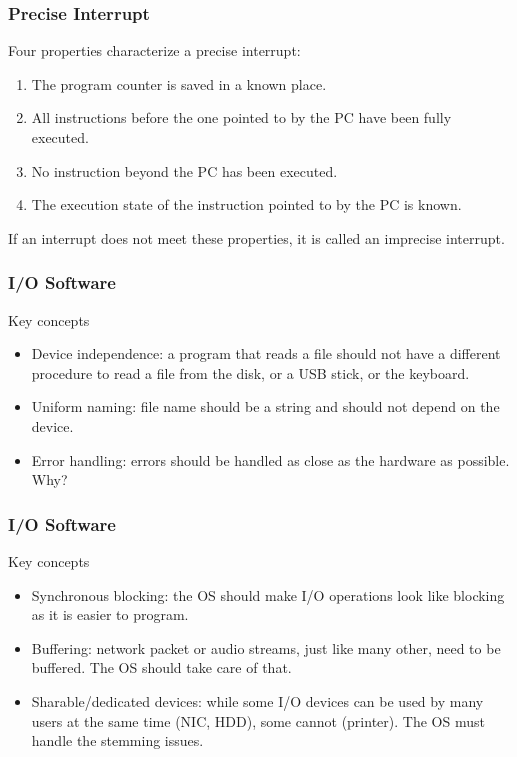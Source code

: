 \begin{frame}
  \frametitle{Precise Interrupt}
  Four properties characterize a precise interrupt:
  \begin{enumerate}
    \item The program counter is saved in a known place.
    \item All instructions before the one pointed to by the PC have been fully executed.
    \item No instruction beyond the PC has been executed.
    \item The execution state of the instruction pointed to by the PC is known.
  \end{enumerate}
  If an interrupt does not meet these properties, it is called an imprecise interrupt.
\end{frame}

\begin{frame}
  \frametitle{I/O Software}
  \begin{block}{Key concepts}
    \begin{itemize}
      \item Device independence: a program that reads a file should not have a different procedure to read a file from the disk, or a USB stick, or the keyboard.
      \item Uniform naming: file name should be a string and should not depend on the device.
      \item Error handling: errors should be handled as close as the hardware as possible. Why? %
    \end{itemize}
  \end{block}
\end{frame}

\begin{frame}
  \frametitle{I/O Software}
  \begin{block}{Key concepts}
    \begin{itemize}
      \item Synchronous blocking: the OS should make I/O operations look like blocking as it is easier to program.
      \item Buffering: network packet or audio streams, just like many other, need to be buffered. The OS should take care of that.
      \item Sharable/dedicated devices: while some I/O devices can be used by many users at the same time (NIC, HDD), some cannot (printer). The OS must handle the stemming issues.
    \end{itemize}
  \end{block}
\end{frame}

